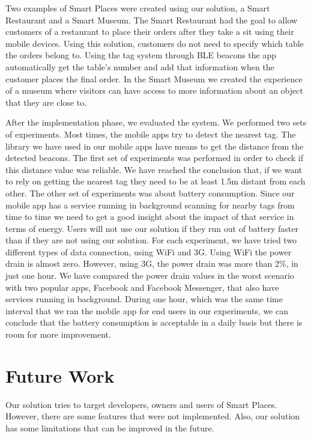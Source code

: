 Two examples of Smart Places were created using our solution, a Smart Restaurant and a Smart Museum.
The Smart Restaurant had the goal to allow customers of a restaurant to place their orders after they take a sit using their mobile devices.
Using this solution, customers do not need to specify which table the orders belong to. Using the tag system through \gls{BLE} beacons the app automatically get the table's number and add that information when the customer places the final order.
In the Smart Museum we created the experience of a museum where visitors can have access to more information about an object that they are close to.

After the implementation phase, we evaluated the system.
We performed two sets of experiments.
Most times, the mobile apps try to detect the nearest tag.
The library we have used in our mobile apps have means to get the distance from the detected beacons.
The first set of experiments was performed in order to check if this distance value was reliable.
We have reached the conclusion that, if we want to rely on getting the nearest tag they need to be at least 1.5m distant from each other.
The other set of experiments was about battery consumption.
Since our mobile app has a service running in background scanning for nearby tags from time to time we need to get a good insight about the impact of that service in terms of energy.
Users will not use our solution if they run out of battery faster than if they are not using our solution.
For each experiment, we have tried two different types of data connection, using \gls{WiFi} and \gls{3G}.
Using \gls{WiFi} the power drain is almost zero.
However, using \gls{3G}, the power drain was more than 2\%, in just one hour.
We have compared the power drain values in the worst scenario with two popular apps, Facebook and Facebook Messenger, that also have services running in background.
During one hour, which was the same time interval that we ran the mobile app for end users in our experiments, we can conclude that the battery consumption is acceptable in a daily basis but there is room for more improvement.

\section{Future Work}
\label{sec:conclusion_future_work}
Our solution tries to target developers, owners and users of Smart Places.
However, there are some features that were not implemented.
Also, our solution has some limitations that can be improved in the future.

